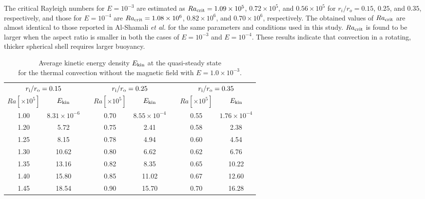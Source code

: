 The critical Rayleigh numbers 
{\color{blue} for $E = 10^{-3}$}
are estimated as $Ra_{\rm crit} = 1.09 \times 10^5$, $0.72 \times 10^5$, and $0.56 \times 10^5$ for $r_i/r_o = 0.15$, $0.25$, and $0.35$, respectively, 
{\color{blue} and those for $E = 10^{-4}$ are $Ra_{\rm crit} = 1.08 \times 10^6$, $0.82 \times 10^6$, and $0.70 \times 10^6$, respectively.
}
The obtained values of $Ra_{\rm crit}$ are almost identical to those reported in Al-Shamali {\it et al.}  for the same parameters and conditions used in this study. 
{\color{red} %
$Ra_{\rm crit}$ is found to be larger when the aspect ratio is smaller in both the cases of $E = 10^{-3}$ and $E = 10^{-4}$. 
These results indicate that convection in a rotating, thicker spherical shell requires larger buoyancy.
}
%
%
\begin{table}
\caption{Average kinetic energy density $E_{\rm kin}$ at the quasi-steady state \\
for the thermal convection without the magnetic field with $E = 1.0 \times 10^{-3}$.}
\begin{center}
\begin{tabular}{|ccc|ccc|cc|}
   \hline
  \multicolumn{2}{|c|}{$r_{\rm i}/r_{\rm o} = 0.15$} & \hspace{5mm} &
  \multicolumn{2}{|c|}{$r_{\rm i}/r_{\rm o} = 0.25$} & \hspace{5mm} &
  \multicolumn{2}{|c|}{$r_{\rm i}/r_{\rm o} = 0.35$} \\
  $Ra[\times 10^5] $ &  $E_{\rm kin}$ & &
  $Ra[\times 10^5] $ &  $E_{\rm kin}$ & &
  $Ra[\times 10^5] $ &  $E_{\rm kin}$ \\
    \hline
   1.00  &  $8.31 \times 10^{-6} $ & &  0.70 &  $8.55 \times 10^{-4}$ & &  0.55  &  $1.76 \times 10^{-4}$ \\
   1.20  &  5.72 & & 0.75 &  2.41 & &  0.58  &  2.38\\
   1.25 &  8.15 & &  0.78  &  4.94 & &  0.60  &  4.54\\
   1.30  &  10.62 & &  0.80  &  6.62 & &  0.62  &  6.76  \\
   1.35 &  13.16 & &  0.82  & 8.35 & &  0.65  &  10.22 \\
   1.40  &  15.80 & &  0.85  &  11.02 & &  0.67  &  12.60 \\
   1.45  &  18.54 & &  0.90  &  15.70 & &  0.70  &  16.28\\
 \hline
\end{tabular}
\end{center}
\label{table:Rac}
\end{table}

